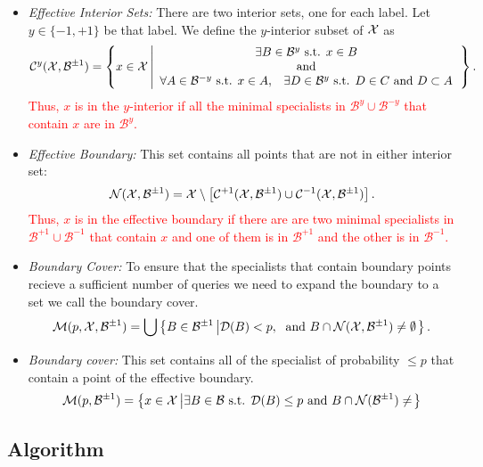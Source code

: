 \documentclass{article}
\newcommand{\X}{{\cal X}}
\newcommand{\D}{{\cal D}}
\newcommand{\lrb}[1]{\left[#1\right]}
\newcommand{\cB}{\mathcal{B}}
\newcommand{\new}[1]{\textcolor{red}{#1}}
\newcommand{\universe}[1]{{\cal #1}}
\begin{document}
\begin{itemize}
\item {\em  Effective Interior Sets:} There are two interior sets, one for each label.
  Let $y \in \{-1,+1\}$ be that label. We define the $y$-interior subset of $\X$ as
  \[
  \algInterior^{y} (\universe{X},\cB^{\pm 1}) =
  \left\{ x \in \universe{X} \left|
  \begin{array}{c}
    \exists B \in \cB^{y} \mbox{ s.t. } x \in B
    \\ \mbox{ and } \\
    \forall A \in \cB^{-y} \mbox{ s.t. } x \in
    A,\;\;\;
    \exists D \in \cB^{y} \mbox{ s.t. } D \in C
    \mbox{ and } D \subset A
  \end{array}
  \right. 
  \right\}.
\]
\new{Thus, $x$ is in the $y$-interior if all the minimal specialists in $\cB^y\cup\cB^{-y}$
  that contain $x$ are in $\cB^{y}$.}

\item {\em Effective Boundary:} This set contains all points that are not in either interior set:
  \[
  \algBoundary(\universe{X},\cB^{\pm 1}) =
  \universe{X} \setminus \lrb{ \algInterior^{+1} (\universe{X},\cB^{\pm 1}) \cup \algInterior^{-1} (\universe{X},\cB^{\pm 1}) }.
  \]
  \new{Thus, $x$ is in the effective boundary if there are are two minimal specialists in $\cB^{+1}\cup\cB^{-1}$ that contain $x$ and one of them is in $\cB^{+1}$ and the other is in $\cB^{-1}$.}

\item {\em Boundary Cover:} To ensure that the specialists that
  contain boundary points recieve a sufficient number of queries we
  need to expand the boundary to a set we call the boundary cover.
  \[
  \algCover(p,\X,\cB^{\pm 1}) =
  \bigcup \left\{ B \in \cB^{\pm 1} \left|
  \D(B)<p,\;\mbox { and } B \cap \algBoundary(\universe{X},\cB^{\pm 1}) \neq \emptyset
  \right.
  \right\}.
  \]
\item {\em Boundary cover:} This set contains all of the specialist of
  probability $\leq p$ that contain a point of the effective boundary.
  \[
  \cover(p,\cB^{\pm 1}) =
  \left\{ x \in \X \left|
  \exists B \in \cB \mbox{ s.t. } \D(B) \leq p \mbox{ and } B \cap
  \nonconform(\cB^{\pm 1}) \neq \empty
  \right.\right\}
  \]
\end{itemize}


\subsection{Algorithm}
\end{document}
